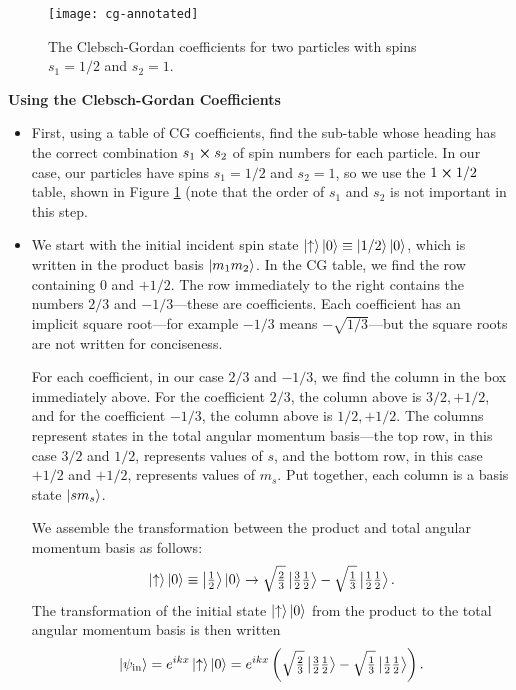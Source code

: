 \documentclass[11pt, a4paper]{article}
\newcommand{\ua}{\uparrow}  %
\begin{document}
\begin{figure}[hbtb!]
\centering
\texttt{[image: cg-annotated]}
\caption{The Clebsch-Gordan coefficients for two particles with spins $ s_{1} = 1/2 $ and $ s_{2} = 1 $.}
\label{fig:cg}
\end{figure}
	
	
\textbf{Using the Clebsch-Gordan Coefficients}	
\begin{itemize}
	\item First, using a table of CG coefficients, find the sub-table whose heading has the correct combination $ s_{1} \cross s_{2} $ of spin numbers for each particle. In our case, our particles have spins $ s_{1} = 1/2 $ and $ s_{2} = 1 $, so we use the $ 1 \cross 1/2 $ table, shown in Figure \ref{fig:cg} (note that the order of $ s_{1} $ and $ s_{2} $ is not important in this step.
	
	\item We start with the initial incident spin state $ \ket{\ua}\ket{0} \equiv \ket{1/2}\ket{0} $, which is written in the product basis $ \ket{m_{1}m_{2}} $. In the CG table, we find the row containing $ 0 $ and $ +1/2 $. The row immediately to the right contains the numbers $ 2/3 $ and $ -1/3 $---these are coefficients. Each coefficient has an implicit square root---for example $ -1/3 $ means $ -\sqrt{1/3} $---but the square roots are not written for conciseness. 
	
	For each coefficient, in our case $ 2/3 $ and $ -1/3 $, we find the column in the box immediately above. For the coefficient $ 2/3 $, the column above is $ 3/2, +1/2 $, and for the coefficient $ -1/3 $, the column above is $ 1/2, +1/2 $. The columns represent states in the total angular momentum basis---the top row, in this case $ 3/2 $ and $ 1/2 $, represents values of $ s $, and the bottom row, in this case $ +1/2 $ and $ +1/2 $, represents values of $ m_{s} $. Put together, each column is a basis state $ \ket{sm_{s}} $.

	We assemble the transformation between the product and total angular momentum basis as follows:
	\begin{equation*}
		\ket{\ua} \ket{0} \equiv \ket{\tfrac{1}{2}}\ket{0} \to \sqrt{\tfrac{2}{3}} \ket{\tfrac{3}{2}\tfrac{1}{2}} - \sqrt{\tfrac{1}{3}}\ket{\tfrac{1}{2}\tfrac{1}{2}}.
	\end{equation*}
	The transformation of the initial state $ \ket{\ua}\ket{0} $ from the product to the total angular momentum basis is then written
	\begin{equation*}
		\ket{\psi_{\text{in}}} = e^{ikx}\ket{\ua} \ket{0} = e^{ikx}\left(\sqrt{\tfrac{2}{3}} \ket{\tfrac{3}{2}\tfrac{1}{2}} - \sqrt{\tfrac{1}{3}}\ket{\tfrac{1}{2}\tfrac{1}{2}}\right).
	\end{equation*}
	

\end{itemize}
\end{document}
